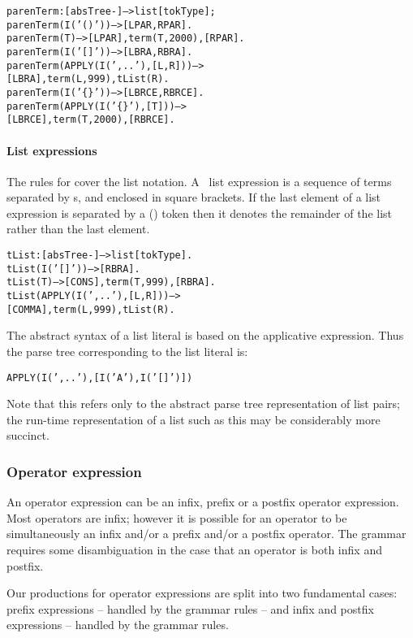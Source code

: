 \begin{alltt}
parenTerm:[absTree-]-->list[tokType];
parenTerm(I('()')) --> [LPAR,RPAR].
parenTerm(T) --> [LPAR],term(T,2000),[RPAR].
parenTerm(I('[]')) --> [LBRA,RBRA].
parenTerm(APPLY(I(',..'),[L,R])) --> 
    [LBRA],term(L,999), tList(R).
parenTerm(I('\{\}')) --> [LBRCE,RBRCE].
parenTerm(APPLY(I('\{\}'),[T])) -->
    [LBRCE],term(T,2000),[RBRCE].
\end{alltt}

\paragraph{List expressions}
\label{grammar:lists}    
The rules for  cover the list notation. A \go\ list expression is a sequence of terms separated by s, and enclosed in square brackets. If the last element of a list expression is separated by a  () token then it denotes the remainder of the list rather than the last element.
     
\begin{alltt}
tList:[absTree-]-->list[tokType].
tList(I('[]')) --> [RBRA].
tList(T) --> [CONS], term(T,999), [RBRA].
tList(APPLY(I(',..'),[L,R])) -->
    [COMMA],term(L,999),tList(R).
\end{alltt}
     
The abstract syntax of a list literal is based on the  applicative expression. Thus the parse tree corresponding to the list literal \q{[A]} is:
\begin{alltt}
APPLY(I(',..'),[I('A'),I('[]')])
\end{alltt}
Note that this refers only to the abstract parse tree representation of list pairs; the run-time representation of a list such as this may be considerably more succinct.

\subsubsection{Operator expression}
\label{grammar:operator-expression}
An operator expression can be an infix, prefix or a postfix operator expression. Most operators are infix; however it is possible for an operator to be simultaneously an infix and/or a prefix and/or a postfix operator. The grammar requires some disambiguation in the case that an operator is both infix and postfix.
     
Our productions for operator expressions are split into two fundamental cases: prefix expressions -- handled by the  grammar rules -- and infix and postfix expressions -- handled by the  grammar rules.

